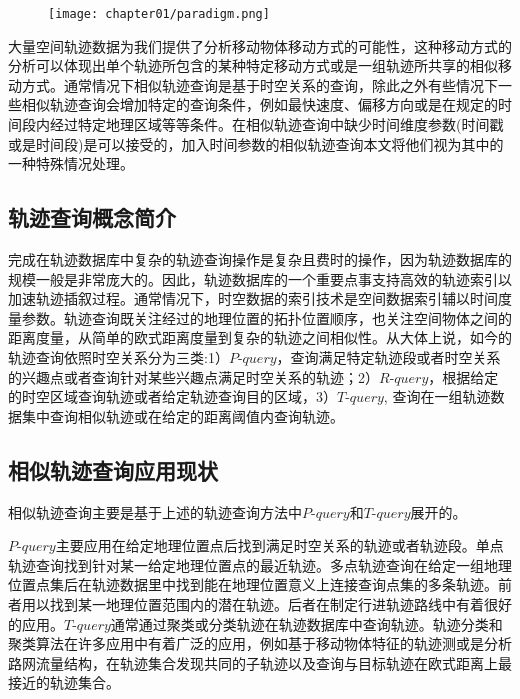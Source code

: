 \begin{figure}[!htp]
  \centering
  \texttt{[image: chapter01/paradigm.png]}
\end{figure}

大量空间轨迹数据为我们提供了分析移动物体移动方式的可能性，这种移动方式的分析可以体现出单个轨迹所包含的某种特定移动方式或是一组轨迹所共享的相似移动方式。通常情况下相似轨迹查询是基于时空关系的查询，除此之外有些情况下一些相似轨迹查询会增加特定的查询条件，例如最快速度、偏移方向或是在规定的时间段内经过特定地理区域等等条件。在相似轨迹查询中缺少时间维度参数(时间戳或是时间段)是可以接受的，加入时间参数的相似轨迹查询本文将他们视为其中的一种特殊情况处理。
\\

\subsection{轨迹查询概念简介}
\label{sec:requirements}
完成在轨迹数据库中复杂的轨迹查询操作是复杂且费时的操作，因为轨迹数据库的规模一般是非常庞大的。因此，轨迹数据库的一个重要点事支持高效的轨迹索引以加速轨迹插叙过程。通常情况下，时空数据的索引技术是空间数据索引辅以时间度量参数。轨迹查询\cite{zheng2011computing}既关注经过的地理位置的拓扑位置顺序，也关注空间物体之间的距离度量，从简单的欧式距离度量到复杂的轨迹之间相似性。从大体上说，如今的轨迹查询依照时空关系分为三类:1）$P$-$query$，查询满足特定轨迹段或者时空关系的兴趣点或者查询针对某些兴趣点满足时空关系的轨迹；2）$R$-$query$，根据给定的时空区域查询轨迹或者给定轨迹查询目的区域，3）$T$-$query$, 查询在一组轨迹数据集中查询相似轨迹或在给定的距离阈值内查询轨迹。
\\

\subsection{相似轨迹查询应用现状}
\label{sec:requirements}
相似轨迹查询主要是基于上述的轨迹查询方法中$P$-$query$和$T$-$query$展开的。

$P$-$query$主要应用在给定地理位置点后找到满足时空关系的轨迹或者轨迹段。单点轨迹查询找到针对某一给定地理位置点的最近轨迹。多点轨迹查询在给定一组地理位置点集后在轨迹数据里中找到能在地理位置意义上连接查询点集的多条轨迹。前者用以找到某一地理位置范围内的潜在轨迹。后者在制定行进轨迹路线中有着很好的应用。$T$-$query$通常通过聚类或分类轨迹在轨迹数据库中查询轨迹。轨迹分类和聚类算法在许多应用中有着广泛的应用，例如基于移动物体特征的轨迹测或是分析路网流量结构，在轨迹集合发现共同的子轨迹以及查询与目标轨迹在欧式距离上最接近的轨迹集合。

